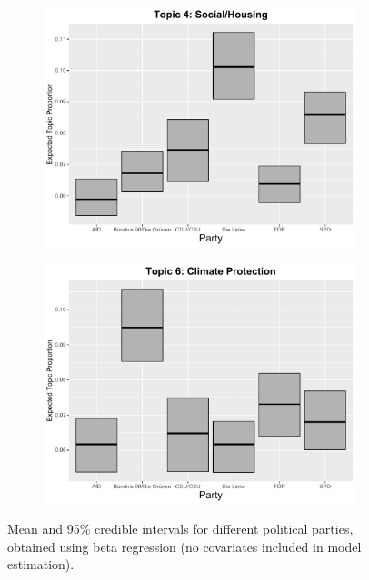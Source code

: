 \begin{figure}[h!]
  \centering
  \begin{subfigure}[b]{0.4\linewidth}
    \includegraphics[width=\linewidth]{../plots/appendix/4_6/beta_t4_cat_ctm.pdf}
  \end{subfigure}
  \begin{subfigure}[b]{0.4\linewidth}
    \includegraphics[width=\linewidth]{../plots/appendix/4_6/beta_t6_cat_ctm.pdf}
  \end{subfigure}
  \caption{Mean and 95\% credible intervals for different political parties, obtained using beta regression (no covariates included in model estimation).}
  \label{fig:beta_t46_cat_ctm}
\end{figure}

